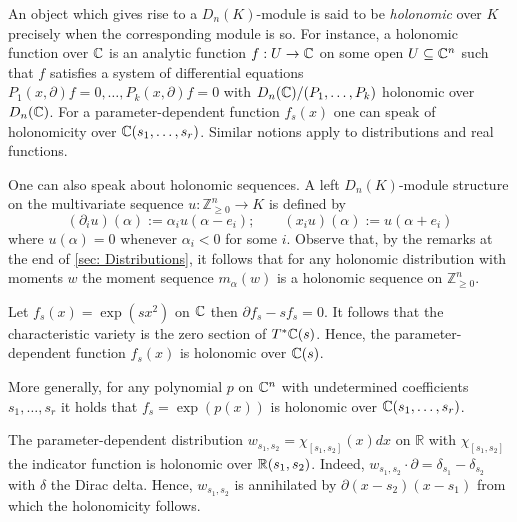 An object which gives rise to a $D_n(K)$-module is said to be {\it holonomic} over $K$ precisely when the corresponding module is so.
For instance, a holonomic function over $\mathbb{C}$ is an analytic function $f:U\to \mathbb{C}$ on some open $U\subseteq \mathbb{C}^n$ such that $f$ satisfies a system of differential equations $P_{1}(x,\partial)f = 0,\ldots, P_{k}(x,\partial)f=0$ with $D_n(\mathbb{C})/(P_1,\ldots,P_k)$ holonomic over $D_n(\mathbb{C})$.
For a parameter-dependent function $f_s(x)$ one can speak of holonomicity over $\mathbb{C}(s_1,\ldots,s_r)$.
Similar notions apply to distributions and real functions.

One can also speak about holonomic sequences.
A left $D_n(K)$-module structure on the multivariate sequence $u:\mathbb{Z}_{\geq 0}^n \to K$ is defined by
$$( \partial_iu)(\alpha) := \alpha_i u(\alpha-e_i); \qquad (x_iu)(\alpha):= u(\alpha + e_i)$$
where $u(\alpha) = 0$ whenever $\alpha_i<0$ for some $i$.
Observe that, by the remarks at the end of \cref{sec: Distributions}, it follows that for any holonomic distribution with moments $w$ the moment sequence $m_\alpha(w)$ is a holonomic sequence on $\mathbb{Z}_{\geq 0}^n$.
\begin{example}
  Let $f_s(x) = \exp(sx^2)$ on $\mathbb{C}$ then  $\partial f_s - sf_s = 0$.
  It follows that the characteristic variety is the zero section of $T^*\mathbb{C}(s)$.
  Hence, the parameter-dependent function $f_s(x)$ is holonomic over $\mathbb{C}(s)$.

  More generally, for any polynomial $p$ on $\mathbb{C}^n$ with undetermined coefficients $s_1,\ldots,s_r$ it holds that $f_s = \exp(p(x))$ is holonomic over $\mathbb{C}(s_1,\ldots,s_r)$.
\end{example}
\begin{example}\label{ex: Indicator}
  The parameter-dependent distribution $w_{s_1,s_2} = \chi_{[s_1,s_2]}(x)dx$ on $\mathbb{R}$ with $\chi_{[s_1,s_2]}$ the indicator function is holonomic over $\mathbb{R}(s_1,s_2)$.
  Indeed, $w_{s_1,s_2}\cdot \partial = \delta_{s_1} -\delta_{s_2}$ with $\delta$ the Dirac delta.
  Hence, $w_{s_1,s_2}$ is annihilated by $\partial(x-s_2)(x-s_1)$ from which the holonomicity follows.
\end{example}

